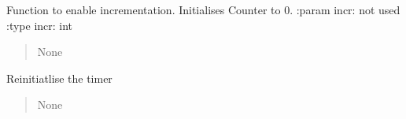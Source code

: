 \documentclass[letterpaper,10pt,english]{sphinxmanual}
\begin{document}
\begin{fulllineitems}
\begin{fulllineitems}
\begin{quote}
\begin{description}
\end{description}\end{quote}

\end{fulllineitems}


\begin{fulllineitems}
\label{\detokenize{api/killMS.Other:killMS.Other.ClassTimeIt.ClassTimeIt.enableIncr}}
\pysigstartsignatures
{}
\pysigstopsignatures
\sphinxAtStartPar
Function to enable incrementation. Initialises Counter to 0.
:param incr: not used
:type incr: int
\begin{quote}\begin{description}
\sphinxAtStartPar
None

\end{description}\end{quote}

\end{fulllineitems}


\begin{fulllineitems}
\label{\detokenize{api/killMS.Other:killMS.Other.ClassTimeIt.ClassTimeIt.reinit}}
\pysigstartsignatures
{}
\pysigstopsignatures
\sphinxAtStartPar
Reinitiatlise the timer
\begin{quote}\begin{description}
\sphinxAtStartPar
None

\end{description}\end{quote}

\end{fulllineitems}



\end{fulllineitems}
\end{document}
